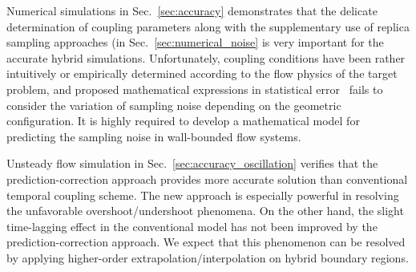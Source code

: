 \documentclass[]{aiaa-tc}%
\newcommand{\skonote}[1]{ {\textcolor{green} { ***Jeff: #1 }}}
\begin{document}
Numerical simulations in Sec.~\ref{sec:accuracy} demonstrates that the delicate determination of coupling parameters along with the supplementary use of replica sampling approaches (in Sec.~\ref{sec:numerical_noise} is very important for the accurate hybrid simulations. Unfortunately, coupling conditions have been rather intuitively or empirically determined according to the flow physics of the target problem, and proposed mathematical expressions in statistical error~\cite{Hadjicon3,Time_Mechanism} fails to consider the variation of sampling noise depending on the geometric configuration. It is highly required to develop a mathematical model for predicting the sampling noise in wall-bounded flow systems.

Unsteady flow simulation in Sec.~\ref{sec:accuracy_oscillation} verifies that the prediction-correction approach provides more accurate solution than conventional temporal coupling scheme. The new approach is especially powerful in resolving the unfavorable overshoot/undershoot phenomena. On the other hand, the slight time-lagging effect in the conventional model has not been improved by the prediction-correction approach. We expect that this phenomenon can be resolved by applying higher-order extrapolation/interpolation on hybrid boundary regions.

\end{document}
